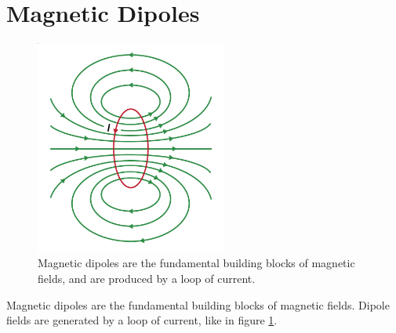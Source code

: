 \documentclass{book}
\begin{document}
\section{Magnetic Dipoles}
\begin{figure}
    \centering
    \includegraphics[height=200pt]{Magneticfieldofacurrentloop.png}
    \caption{Magnetic dipoles are the fundamental building blocks of magnetic fields, and are produced by a loop of current.}
    \label{fig:dipolefieldmagnet}
\end{figure}
Magnetic dipoles are the fundamental building blocks of magnetic fields. Dipole fields are generated by a loop of current, like in figure \ref{fig:dipolefieldmagnet}.
\end{document}
